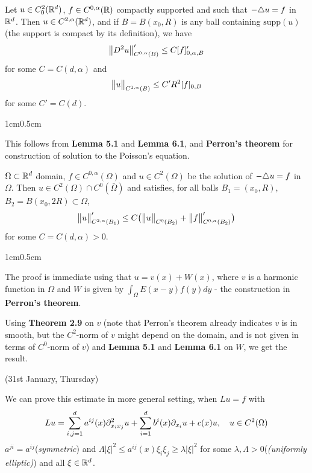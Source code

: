 \documentclass[12pt,a4paper]{article}
\newenvironment{proof}
{\begin{changemargin}{1cm}{0.5cm} 
	}%
	{\end{changemargin}
}
\newenvironment{p}
{\begin{proof} 
	}%
	{\end{proof}
}
\begin{document}
 Let $u\in C^2_0(\mathbb{R}^d)$, $f\in C^{0, \alpha}(\mathbb{R})$ compactly supported and such that $-\triangle u = f$ in $\mathbb{R}^d$. Then $u\in C^{2, \alpha}(\mathbb{R}^d)$, and if $B= B(x_0, R)$ is any ball containing $\text{supp}(u)$ (the support is compact by its definition), we have
\begin{align*}
\bigl\lVert D^2 u\bigr\rVert_{C^{0, \alpha}(B)}' \leq C [f]_{0, \alpha, B}'
\end{align*}
for some $C =C(d, \alpha)$ and
\begin{align*}
\bigl\lVert u\bigr\rVert_{C^{1,\alpha}(B)}\leq C' R^2 [f]_{0, B}
\end{align*}
for some $C' = C(d)$.
\begin{p}
\pf This follows from \textbf{Lemma 5.1} and \textbf{Lemma 6.1}, and \textbf{Perron's theorem} for construction of solution to the Poisson's equation.

\eop
\end{p}
\s

 $\Omega \subset \mathbb{R}^d$ domain, $f\in C^{0, \alpha}(\Omega)$ and $u\in C^2(\Omega)$ be the solution of $-\triangle u =f$ in $\Omega$. Then $u\in C^2(\Omega) \cap C^0(\bar{\Omega})$ and satisfies, for all balls $B_1 = (x_0, R)$, $B_2= B(x_0, 2R) \subset \Omega$,
\begin{align*}
\bigl\lVert u\bigr\rVert_{C^{2, \alpha}(B_1)}' \leq C \big(\bigl\lVert u\bigr\rVert_{C^0(B_2)} + \bigl\lVert f\bigr\rVert_{C^{0,\alpha}(B_2)}' \big) 
\end{align*}
for some $C =C(d, \alpha)>0$.
\begin{p}
\pf The proof is immediate using that $u= v(x) + W(x)$, where $v$ is a harmonic function in $\Omega$ and $W$ is given by $\int_{\Omega} E(x-y)f(y)dy$ - the construction in \textbf{Perron's theorem}.

\quad Using \textbf{Theorem 2.9} on $v$ (note that Perron's theorem already indicates $v$ is in smooth, but the $C^2$-norm of $v$ might depend on the domain, and is not given in terms of $C^0$-norm of $v$) and \textbf{Lemma 5.1} and \textbf{Lemma 6.1} on $W$, we get the result.

\eop
\end{p}
\s

\newday

(31st January, Thursday)
\s


We can prove this estimate in more general setting, when $Lu =f$ with
\begin{align*}
Lu = \sum_{i,j=1}^d a^{ij}(x) \partial^2_{x_i x_j} u + \sum_{i=1}^d b^i(x) \partial_{x_i} u + c(x)u, \quad u\in C^2(\Omega)
\end{align*}
$a^{ji} = a^{ij}$(\emph{symmetric}) and $\Lambda |\xi|^2 \leq a^{ij}(x) \xi_i \xi_j \geq \lambda |\xi|^2$ for some $\lambda, \Lambda >0$(\emph{(uniformly elliptic)}) and all $\xi \in \mathbb{R}^d$.
\s
\end{document}
